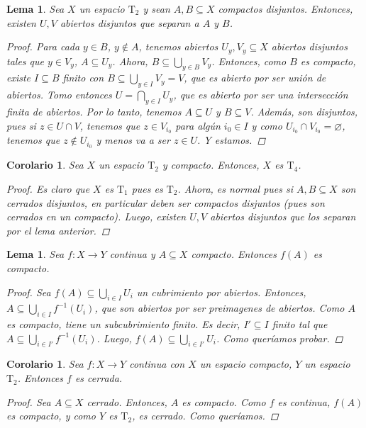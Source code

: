 \documentclass[12pt]{book}
\newtheorem{lem}[teo]{Lema}
\newtheorem{cor}[teo]{Corolario}
\theoremstyle{definition}
\let\emptyset\varnothing
\begin{document}
\begin{lem}
Sea $X$ un espacio $\mathrm{T}_2$ y sean $A,B\subseteq X$ compactos disjuntos. Entonces, existen $U,V$ abiertos disjuntos que separan a $A$ y $B$.
\begin{proof}
Para cada $y\in B$, $y\notin A$, tenemos abiertos $U_y,V_y\subseteq X$ abiertos disjuntos tales que $y\in V_y$, $A\subseteq U_y$. Ahora, $B\subseteq\displaystyle\bigcup_{y\in B} V_y$. Entonces, como $B$ es compacto, existe $I\subseteq B$ finito con $B\subseteq\displaystyle\bigcup_{y\in I}V_y = V$, que es abierto por ser unión de abiertos. Tomo entonces $U=\displaystyle\bigcap_{y\in I}U_y$, que es abierto por ser una intersección finita de abiertos. Por lo tanto, tenemos $A\subseteq U$ y $B\subseteq V$. Además, son disjuntos, pues si $z\in U\cap V$, tenemos que $z\in V_{i_0}$ para algún $i_0\in I$ y como $U_{i_0}\cap V_{i_0}=\emptyset$, tenemos que $z\notin U_{i_0}$ y menos va a ser $z\in U$. Y estamos.
\end{proof}
\end{lem}

\begin{cor}
Sea $X$ un espacio $\mathrm{T}_2$ y compacto. Entonces, $X$ es $\mathrm{T}_4$.
\begin{proof}
Es claro que $X$ es $\mathrm{T}_1$ pues es $\mathrm{T}_2$. Ahora, es normal pues si $A,B\subseteq X$ son cerrados disjuntos, en particular deben ser compactos disjuntos (pues son cerrados en un compacto). Luego, existen $U,V$ abiertos disjuntos que los separan por el lema anterior.
\end{proof}
\end{cor}

\begin{lem}
Sea $f:X\to Y$ continua y $A\subseteq X$ compacto. Entonces $f(A)$ es compacto.
\begin{proof}
Sea $f(A)\subseteq \displaystyle\bigcup_{i\in I}U_i$ un cubrimiento por abiertos. Entonces, $A\subseteq\displaystyle\bigcup_{i\in I}f^{-1}(U_i)$, que son abiertos por ser preimagenes de abiertos. Como $A$ es compacto, tiene un subcubrimiento finito. Es decir, $I'\subseteq I$ finito tal que $A\subseteq\displaystyle\bigcup_{i\in I'}f^{-1}(U_i)$.  Luego, $f(A)\subseteq\displaystyle\bigcup_{i\in I'} U_i$. Como queríamos probar.
\end{proof}
\end{lem}

\begin{cor}
Sea $f:X\to Y$ continua con $X$ un espacio compacto, $Y$ un espacio $\mathrm{T}_2$. Entonces $f$ es cerrada.
\begin{proof}
Sea $A\subseteq X$ cerrado. Entonces, $A$ es compacto. Como $f$ es continua, $f(A)$ es compacto, y como $Y$ es $\mathrm{T}_2$, es cerrado. Como queríamos.
\end{proof}
\end{cor}
\end{document}

